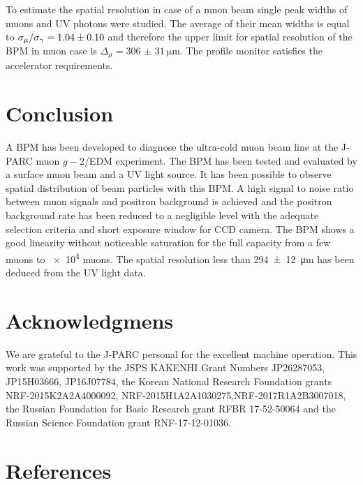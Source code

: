 \documentclass[preprint,3p,twocolumn]{elsarticle}
\begin{document}
To estimate the spatial resolution in case of a muon beam single peak widths of muons and UV photons were studied.
The average of their mean widths is equal to
$\sigma_{\mu} / \sigma_{\gamma} = \num{1.04 \pm 0.10}$
and therefore the upper limit for spatial resolution of the BPM in muon case is
$\Delta_\mu = \SI{306(31)}{\um}$.
The profile monitor satisfies the accelerator requirements.


\section{Conclusion}

A BPM has been developed to diagnose the ultra-cold muon beam line at the J-PARC muon $g-2$/EDM experiment. The BPM has been tested and evaluated by a surface muon beam and a UV light source.
It has been possible to observe spatial distribution of beam particles with this BPM.
A high signal to noise ratio between muon signals and positron background is achieved and the positron background rate has been reduced to a negligible level with the adequate selection criteria and short exposure window for CCD camera.
The BPM shows a good linearity without noticeable saturation for the full capacity from a few muons to \num{e4} muons. The spatial resolution less than \SI{294\pm12}{\micro\metre} has been deduced from the UV light data.


\section*{Acknowledgmens}

We are grateful to the J-PARC personal for the excellent machine operation.
This work was supported by 
the JSPS KAKENHI Grant Numbers JP26287053, JP15H03666, JP16J07784,
the Korean National Research Foundation grants NRF-2015K2A2A4000092, NRF-2015H1A2A1030275,NRF-2017R1A2B3007018,
the Russian Foundation for Basic Research grant RFBR 17-52-50064 and
the Russian Science Foundation grant RNF-17-12-01036. 

\section*{References}


\end{document}
